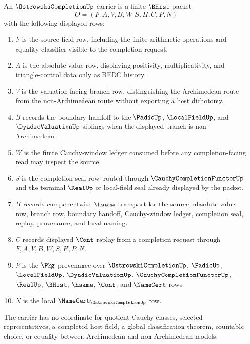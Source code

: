 \begin{definition}
\label{def:ostrowski-completion-carrier}
An $\OstrowskiCompletionUp$ carrier is a finite $\BHist$ packet
$$
O=(F,A,V,B,W,S,H,C,P,N)
$$
with the following displayed rows:
\begin{enumerate}
\item $F$ is the source field row, including the finite arithmetic operations and equality classifier visible to the completion request.
\item $A$ is the absolute-value row, displaying positivity, multiplicativity, and triangle-control data only as BEDC history.
\item $V$ is the valuation-facing branch row, distinguishing the Archimedean route from the non-Archimedean route without exporting a host dichotomy.
\item $B$ records the boundary handoff to the $\PadicUp$, $\LocalFieldUp$, and $\DyadicValuationUp$ siblings when the displayed branch is non-Archimedean.
\item $W$ is the finite Cauchy-window ledger consumed before any completion-facing read may inspect the source.
\item $S$ is the completion seal row, routed through $\CauchyCompletionFunctorUp$ and the terminal $\RealUp$ or local-field seal already displayed by the packet.
\item $H$ records componentwise $\hsame$ transport for the source, absolute-value row, branch row, boundary handoff, Cauchy-window ledger, completion seal, replay, provenance, and local naming.
\item $C$ records displayed $\Cont$ replay from a completion request through $F,A,V,B,W,S,H,P,N$.
\item $P$ is the $\Pkg$ provenance over $\OstrowskiCompletionUp$, $\PadicUp$, $\LocalFieldUp$, $\DyadicValuationUp$, $\CauchyCompletionFunctorUp$, $\RealUp$, $\BHist$, $\hsame$, $\Cont$, and $\NameCert$ rows.
\item $N$ is the local $\NameCert_{\OstrowskiCompletionUp}$ row.
\end{enumerate}
The carrier has no coordinate for quotient Cauchy classes, selected representatives, a completed host field, a global classification theorem, countable choice, or equality between Archimedean and non-Archimedean models.
\end{definition}

